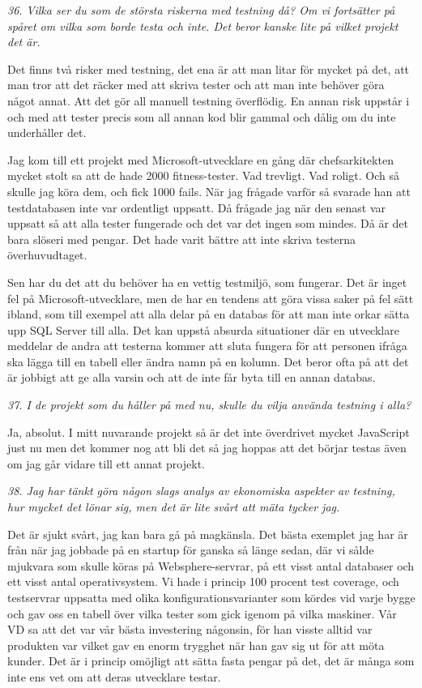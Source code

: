 \documentclass[11pt]{article}
\begin{document}
\emph{36. Vilka ser du som de största riskerna med testning då? Om vi fortsätter på spåret om vilka som borde testa och inte. Det beror kanske lite på vilket projekt det är.}

Det finns två risker med testning, det ena är att man litar för mycket på det, att man tror att det räcker med att skriva tester och att man inte behöver göra något annat. Att det gör all manuell testning överflödig. En annan risk uppstår i och med att tester precis som all annan kod blir gammal och dålig om du inte underhåller det.

Jag kom till ett projekt med Microsoft-utvecklare en gång där chefsarkitekten mycket stolt sa att de hade 2000 fitness-tester. Vad trevligt. Vad roligt. Och så skulle jag köra dem, och fick 1000 fails. När jag frågade varför så svarade han att testdatabasen inte var ordentligt uppsatt. Då frågade jag när den senast var uppsatt så att alla tester fungerade och det var det ingen som mindes. Då är det bara slöseri med pengar. Det hade varit bättre att inte skriva testerna överhuvudtaget.

Sen har du det att du behöver ha en vettig testmiljö, som fungerar. Det är inget fel på Microsoft-utvecklare, men de har en tendens att göra vissa saker på fel sätt ibland, som till exempel att alla delar på en databas för att man inte orkar sätta upp SQL Server till alla. Det kan uppstå absurda situationer där en utvecklare meddelar de andra att testerna kommer att sluta fungera för att personen ifråga ska lägga till en tabell eller ändra namn på en kolumn. Det beror ofta på att det är jobbigt att ge alla varsin och att de inte får byta till en annan databas.

\emph{37. I de projekt som du håller på med nu, skulle du vilja använda testning i alla?}

Ja, absolut. I mitt nuvarande projekt så är det inte överdrivet mycket JavaScript just nu men det kommer nog att bli det så jag hoppas att det börjar testas även om jag går vidare till ett annat projekt.

\emph{38. Jag har tänkt göra någon slags analys av ekonomiska aspekter av testning, hur mycket det lönar sig, men det är lite svårt att mäta tycker jag.}

Det är sjukt svårt, jag kan bara gå på magkänsla. Det bästa exemplet jag har är från när jag jobbade på en startup för ganska så länge sedan, där vi sålde mjukvara som skulle köras på Websphere-servrar, på ett visst antal databaser och ett visst antal operativsystem. Vi hade i princip 100 procent test coverage, och testservrar uppsatta med olika konfigurationsvarianter som kördes vid varje bygge och gav oss en tabell över vilka tester som gick igenom på vilka maskiner. Vår VD sa att det var vår bästa investering någonsin, för han visste alltid var produkten var vilket gav en enorm trygghet när han gav sig ut för att möta kunder. Det är i princip omöjligt att sätta fasta pengar på det, det är många som inte ens vet om att deras utvecklare testar.
\end{document}
